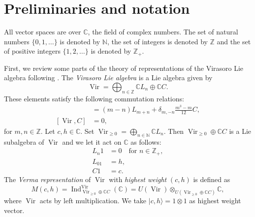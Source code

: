 \documentclass[a4paper, 12pt, reqno]{amsart}
\theoremstyle{remark}
\DeclareMathOperator{\Vir}{Vir}
\DeclareMathOperator{\Ind}{Ind}
\begin{document}
\section{Preliminaries and notation}
\label{sec:prel-notat}

All vector spaces are over $\mathbb{C}$, the field of complex numbers.
The set of natural numbers $\{0, 1, \dots\}$ is denoted by $\mathbb{N}$, the set of integers is denoted by $\mathbb{Z}$ and the set of positive integers $\{1, 2, \dots\}$ is denoted by $\mathbb{Z}_+$.

First, we review some parts of the theory of representations of the Virasoro Lie algebra following \cite{kac_bombay_2013}.
The \emph{Virasoro Lie algebra} is a Lie algebra given by
\begin{equation*}
  \Vir = \bigoplus_{n \in \mathbb{Z}}\mathbb{C}L_n \oplus \mathbb{C}C.
\end{equation*}
These elements satisfy the following commutation relations:
\begin{align*}
  [L_m, L_n] &= (m - n)L_{m + n} + \delta_{m, -n}\frac{m^3 - m}{12}C, \\
  [\Vir, C] &= 0, 
\end{align*}
for $m, n \in \mathbb{Z}$.
Let $c, h \in \mathbb{C}$.
Set $\Vir_{\ge 0} = \bigoplus_{n \in \mathbb{N}}\mathbb{C}L_n$.
Then $\Vir_{\ge 0} \oplus \mathbb{C}C$ is a Lie subalgebra of $\Vir$ and we let it act on $\mathbb{C}$ as follows:
\begin{align*}
  L_n1 &= 0 \quad \text{for }n \in \mathbb{Z}_+, \\
  L_01 &= h, \\
  C1 &= c.
\end{align*}
The \emph{Verma representation} of $\Vir$ with \emph{highest weight} $(c, h)$ is defined as 
\begin{equation*}
  M(c, h) = \Ind^{\Vir}_{\Vir_{\ge 0} \oplus \mathbb{C}C}(\mathbb{C}) = U(\Vir) \otimes_{U(\Vir_{\ge 0} \oplus \mathbb{C}C)} \mathbb{C},
\end{equation*}
where $\Vir$ acts by left multiplication.
We take $|c, h\rangle = 1 \otimes 1$ as highest weight vector.
\end{document}
